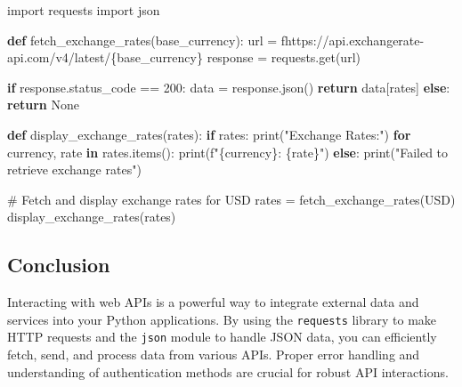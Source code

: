 \documentclass[
  letterpaper,
  DIV=11,
  numbers=noendperiod]{scrreprt}
\newenvironment{Shaded}{\begin{snugshade}}{\end{snugshade}}
\newcommand{\BuiltInTok}[1]{\textcolor[rgb]{0.00,0.23,0.31}{#1}}
\newcommand{\CommentTok}[1]{\textcolor[rgb]{0.37,0.37,0.37}{#1}}
\newcommand{\ControlFlowTok}[1]{\textcolor[rgb]{0.00,0.23,0.31}{\textbf{#1}}}
\newcommand{\DecValTok}[1]{\textcolor[rgb]{0.68,0.00,0.00}{#1}}
\newcommand{\ImportTok}[1]{\textcolor[rgb]{0.00,0.46,0.62}{#1}}
\newcommand{\KeywordTok}[1]{\textcolor[rgb]{0.00,0.23,0.31}{\textbf{#1}}}
\newcommand{\NormalTok}[1]{\textcolor[rgb]{0.00,0.23,0.31}{#1}}
\newcommand{\OperatorTok}[1]{\textcolor[rgb]{0.37,0.37,0.37}{#1}}
\newcommand{\SpecialCharTok}[1]{\textcolor[rgb]{0.37,0.37,0.37}{#1}}
\newcommand{\SpecialStringTok}[1]{\textcolor[rgb]{0.13,0.47,0.30}{#1}}
\newcommand{\StringTok}[1]{\textcolor[rgb]{0.13,0.47,0.30}{#1}}
\newcommand{\VariableTok}[1]{\textcolor[rgb]{0.07,0.07,0.07}{#1}}
\begin{document}
\begin{Shaded}
\begin{Highlighting}[]
\ImportTok{import}\NormalTok{ requests}
\ImportTok{import}\NormalTok{ json}

\KeywordTok{def}\NormalTok{ fetch\_exchange\_rates(base\_currency):}
\NormalTok{    url }\OperatorTok{=} \SpecialStringTok{f\textquotesingle{}https://api.exchangerate{-}api.com/v4/latest/}\SpecialCharTok{\{}\NormalTok{base\_currency}\SpecialCharTok{\}}\SpecialStringTok{\textquotesingle{}}
\NormalTok{    response }\OperatorTok{=}\NormalTok{ requests.get(url)}
    
    \ControlFlowTok{if}\NormalTok{ response.status\_code }\OperatorTok{==} \DecValTok{200}\NormalTok{:}
\NormalTok{        data }\OperatorTok{=}\NormalTok{ response.json()}
        \ControlFlowTok{return}\NormalTok{ data[}\StringTok{\textquotesingle{}rates\textquotesingle{}}\NormalTok{]}
    \ControlFlowTok{else}\NormalTok{:}
        \ControlFlowTok{return} \VariableTok{None}

\KeywordTok{def}\NormalTok{ display\_exchange\_rates(rates):}
    \ControlFlowTok{if}\NormalTok{ rates:}
        \BuiltInTok{print}\NormalTok{(}\StringTok{"Exchange Rates:"}\NormalTok{)}
        \ControlFlowTok{for}\NormalTok{ currency, rate }\KeywordTok{in}\NormalTok{ rates.items():}
            \BuiltInTok{print}\NormalTok{(}\SpecialStringTok{f"}\SpecialCharTok{\{}\NormalTok{currency}\SpecialCharTok{\}}\SpecialStringTok{: }\SpecialCharTok{\{}\NormalTok{rate}\SpecialCharTok{\}}\SpecialStringTok{"}\NormalTok{)}
    \ControlFlowTok{else}\NormalTok{:}
        \BuiltInTok{print}\NormalTok{(}\StringTok{"Failed to retrieve exchange rates"}\NormalTok{)}

\CommentTok{\# Fetch and display exchange rates for USD}
\NormalTok{rates }\OperatorTok{=}\NormalTok{ fetch\_exchange\_rates(}\StringTok{\textquotesingle{}USD\textquotesingle{}}\NormalTok{)}
\NormalTok{display\_exchange\_rates(rates)}
\end{Highlighting}
\end{Shaded}

\subsection{Conclusion}\label{conclusion-24}

Interacting with web APIs is a powerful way to integrate external data
and services into your Python applications. By using the
\texttt{requests} library to make HTTP requests and the \texttt{json}
module to handle JSON data, you can efficiently fetch, send, and process
data from various APIs. Proper error handling and understanding of
authentication methods are crucial for robust API interactions.
\end{document}
